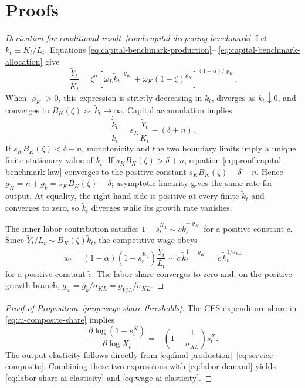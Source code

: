 \section{Proofs}
\label{sec:appendix-proofs}

\begin{proof}[Derivation for conditional result~\ref{cond:capital-deepening-benchmark}]
Let $\widetilde k_t\equiv\widetilde K_t/L_t$. Equations
\eqref{eq:capital-benchmark-production}--
\eqref{eq:capital-benchmark-allocation} give
\begin{equation}
    \frac{\widetilde Y_t}{\widetilde K_t}
    =
    \zeta^\alpha
    \left[
        \omega_L\widetilde k_t^{-\varrho_K}
        +\omega_K(1-\zeta)^{\varrho_K}
    \right]^{(1-\alpha)/\varrho_K}.
    \label{eq:proof-capital-benchmark-output-capital}
\end{equation}
When $\varrho_K>0$, this expression is strictly decreasing in
$\widetilde k_t$, diverges as $\widetilde k_t\downarrow0$, and converges to
$B_K(\zeta)$ as $\widetilde k_t\to\infty$. Capital accumulation implies
\begin{equation}
    \frac{\dot{\widetilde k}_t}{\widetilde k_t}
    =
    s_K\frac{\widetilde Y_t}{\widetilde K_t}
    -(\delta+n).
    \label{eq:proof-capital-benchmark-law}
\end{equation}
If $s_KB_K(\zeta)<\delta+n$, monotonicity and the two boundary limits imply
a unique finite stationary value of $\widetilde k_t$. If
$s_KB_K(\zeta)>\delta+n$, equation
\eqref{eq:proof-capital-benchmark-law} converges to the positive constant
$s_KB_K(\zeta)-\delta-n$. Hence
$g_{\widetilde K}=n+g_{\widetilde k}=s_KB_K(\zeta)-\delta$; asymptotic
linearity gives the same rate for output. At equality, the right-hand side is
positive at every finite $\widetilde k_t$ and converges to zero, so
$\widetilde k_t$ diverges while its growth rate vanishes.

The inner labor contribution satisfies
$1-s^{K_2}_t\sim c\widetilde k_t^{-\varrho_K}$ for a positive constant $c$.
Since $\widetilde Y_t/L_t\sim B_K(\zeta)\widetilde k_t$, the competitive
wage obeys
\[
    w_t
    =(1-\alpha)(1-s^{K_2}_t)\frac{\widetilde Y_t}{L_t}
    \sim \widetilde c\,
    \widetilde k_t^{1-\varrho_K}
    =\widetilde c\,
    \widetilde k_t^{1/\sigma_{KL}}
\]
for a positive constant $\widetilde c$. The labor share converges to zero and,
on the positive-growth branch,
$g_w=g_{\widetilde k}/\sigma_{KL}=g_{\widetilde Y/L}/\sigma_{KL}$.
\end{proof}

\begin{proof}[Proof of Proposition~\ref{prop:wage-share-thresholds}]
The CES expenditure share in \eqref{eq:ai-composite-share} implies
\[
    \frac{\partial\log(1-s^X_t)}{\partial\log X_t}
    =
    -\left(1-\frac{1}{\sigma_{XL}}\right)s^X_t.
\]
The output elasticity follows directly from
\eqref{eq:final-production}--\eqref{eq:service-composite}. Combining these two
expressions with \eqref{eq:labor-demand} yields
\eqref{eq:labor-share-ai-elasticity} and \eqref{eq:wage-ai-elasticity}.
\end{proof}

